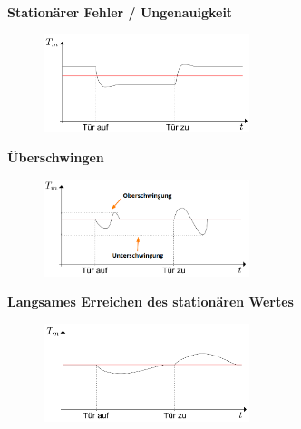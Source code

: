 \documentclass[
  10pt,
  a4paper,
  twocolumn]{article}
\numberwithin{equation}{section}
\begin{document}
\textbf{Stationärer Fehler / Ungenauigkeit}

\begin{figure}[H]

{\centering \includegraphics[width=6cm,height=\textheight]{images/storverhalten/storverhalten_stationary.png}

}

\end{figure}

\textbf{Überschwingen}

\begin{figure}[H]

{\centering \includegraphics[width=6cm,height=\textheight]{images/storverhalten/uber_unterschwingung.png}

}

\end{figure}

\textbf{Langsames Erreichen des stationären Wertes}

\begin{figure}[H]

{\centering \includegraphics[width=6cm,height=\textheight]{images/storverhalten/slow.png}

}

\end{figure}
\end{document}
